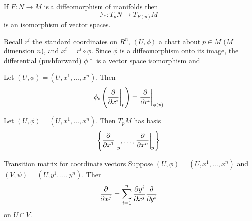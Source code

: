 \begin{proposition}{}{}
    If \(F \colon N \rightarrow M\) is a diffeomorphism of manifolds then
    \[
        F_* \colon T_p N \rightarrow T_{F(p)} M
    \]
    is an isomorphism of vector spaces.
\end{proposition}

Recall \(r^i\) the standard coordinates on \(R^n\), \((U, \phi)\) a chart about \(p \in M\) (\(M\) dimension \(n\)), and \(x^i = r^i \circ \phi\).
Since \(\phi\) is a diffeomorphism onto its image, the differential (pushforward) \(\phi*\) is a vector space isomorphism and

\begin{proposition}{}{}
    Let \((U, \phi) = (U, x^1, \dots, x^n)\). Then
    \begin{equation}
        \phi_* \left( \evalat[\bigg]{\pdv{}{x^i}}{p} \right) = \evalat[\bigg]{\pdv{}{r^i}}{\phi(p)}
    \end{equation}
\end{proposition}
\begin{proposition}{}{}
    Let \((U, \phi) = (U, x^1, \dots, x^n)\). Then \(T_p M\) has basis
    \[
        \left\{ \evalat[\bigg]{\pdv{}{x^1}}{p}, \dots, \evalat[\bigg]{\pdv{}{x^n}}{p} \right\}
    \]
\end{proposition}
\begin{proposition}{Transition matrix for coordinate vectors}{}
    Suppose \((U, \phi) = (U, x^1, \dots, x^n)\) and \((V, \psi) = (U, y^1, \dots, y^n)\).
    Then
    \[
        \pdv{x^j} = \sum_{i=1}^n \pdv{y^i}{x^j}\pdv{y^i}
    \]
    on \(U \cap V\).
\end{proposition}

